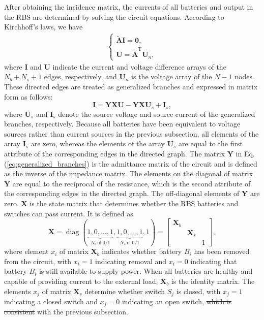 \documentclass{article}
\DeclareMathOperator{\diag}{diag}
\def\T{\mathrm{T}}
\providecommand{\DIFadd}[1]{{\protect\color{blue}\uwave{#1}}} %
\providecommand{\DIFdel}[1]{{\protect\color{red}\sout{#1}}}                      %
\providecommand{\DIFaddbegin}{} %
\providecommand{\DIFaddend}{} %
\providecommand{\DIFdelbegin}{} %
\providecommand{\DIFdelend}{} %
\newcommand{\DIFscaledelfig}{0.5}
\newlength{\DIFdelgraphicswidth} %
\newlength{\DIFdelgraphicsheight} %
\newcommand{\DIFaddincludegraphics}[2][]{{\color{blue}\fbox{\DIFOincludegraphics[#1]{#2}}}} %
\newcommand{\DIFdelincludegraphics}[2][]{%
\sbox{\DIFdelgraphicsbox}{\DIFOincludegraphics[#1]{#2}}%
\settoboxwidth{\DIFdelgraphicswidth}{\DIFdelgraphicsbox} %
\settoboxtotalheight{\DIFdelgraphicsheight}{\DIFdelgraphicsbox} %
\scalebox{\DIFscaledelfig}{%
\parbox[b]{\DIFdelgraphicswidth}{\usebox{\DIFdelgraphicsbox}\\[-\baselineskip] \rule{\DIFdelgraphicswidth}{0em}}\llap{\resizebox{\DIFdelgraphicswidth}{\DIFdelgraphicsheight}{%
\setlength{\unitlength}{\DIFdelgraphicswidth}%
\begin{picture}(1,1)%
\thicklines\linethickness{2pt} %
{\color[rgb]{1,0,0}\put(0,0){\framebox(1,1){}}}%
{\color[rgb]{1,0,0}\put(0,0){\line( 1,1){1}}}%
{\color[rgb]{1,0,0}\put(0,1){\line(1,-1){1}}}%
\end{picture}%
}\hspace*{3pt}}} %
} %
\DeclareRobustCommand{\DIFaddbegin}{\DIFOaddbegin \let\includegraphics\DIFaddincludegraphics} %
\DeclareRobustCommand{\DIFaddend}{\DIFOaddend \let\includegraphics\DIFOincludegraphics} %
\DeclareRobustCommand{\DIFdelbegin}{\DIFOdelbegin \let\includegraphics\DIFdelincludegraphics} %
\DeclareRobustCommand{\DIFdelend}{\DIFOaddend \let\includegraphics\DIFOincludegraphics} %
\begin{document}
After obtaining the incidence matrix, the currents of all batteries and output in the RBS are determined by solving the circuit equations.
According to Kirchhoff's laws, we have
\begin{align}\label{eq:Kirchhoffs_law}
    \begin{cases}
        \bm{\tilde{A}} \bm{I} = \bm{0}, \\
        \bm{U}        = \bm{\tilde{A}}^\T \bm{U}_n,
    \end{cases}
\end{align}
where $\bm{I}$ and $\bm{U}$ indicate the current and voltage difference arrays of the $N_b+N_s+1$ edges, respectively, and
$\bm{U}_n$ is the voltage array of the $N-1$ nodes.
These directed edges are treated as generalized branches and expressed in matrix form as follows:
\begin{equation}\label{eq:generalized_branches}
    \bm{I} = \bm{Y}\bm{X} \bm{U} - \bm{Y}\bm{X} \bm{U}_s +\bm{I}_s,
\end{equation}
where $\bm{U}_s$ and $\bm{I}_s$ denote the source voltage and source current of the generalized branches, respectively.
Because all batteries have been \DIFaddbegin \DIFadd{made }\DIFaddend equivalent to voltage sources rather than current sources in the previous subsection, all elements of the array $\bm{I}_s$ are zero, 
whereas the elements of the array $\bm{U}_s$ are equal to the first attribute of the corresponding edges in the directed graph.
The matrix $\bm{Y}$ in Eq. (\ref{eq:generalized_branches}) is the admittance matrix of the circuit and is defined as the inverse of the impedance matrix.
The elements on the diagonal of matrix $\bm{Y}$ are equal to the reciprocal of the resistance, which is the second attribute of the corresponding edges in the directed graph. The off-diagonal elements of $\bm{Y}$ are zero.
$\bm{X}$ is the state matrix that determines whether the RBS batteries and switches can pass current.
It is defined as
\begin{equation}\label{eq:X}
    \bm{X} = \diag(
    \underbrace{1, 0, \dots, 1}_{N_b~\text{of}~0/1},
    \underbrace{1, 0, \dots, 1}_{N_s~\text{of}~0/1},
    1)
    =\begin{bmatrix}
        \bm{X}_b & & \\
        & \bm{X}_s &\\
        & & 1
    \end{bmatrix},
\end{equation}
where element $x_i$ of matrix $\bm{X}_b$ indicates whether battery $B_i$ has been removed from the circuit, with $x_i=1$ indicating removal and $x_i=0$ indicating that battery $B_i$ is still available to supply power. 
When all batteries are healthy and capable of providing current to the external load, $\bm{X}_b$ is the identity matrix. 
The elements $x_j$ of matrix $\bm{X}_s$ determine whether switch $S_j$ is closed, with $x_j=1$ indicating a closed switch and $x_j=0$ indicating an open switch, \DIFdelbegin \DIFdel{which is consistent }\DIFdelend \DIFaddbegin \DIFadd{consistently }\DIFaddend with the previous subsection.
\end{document}
